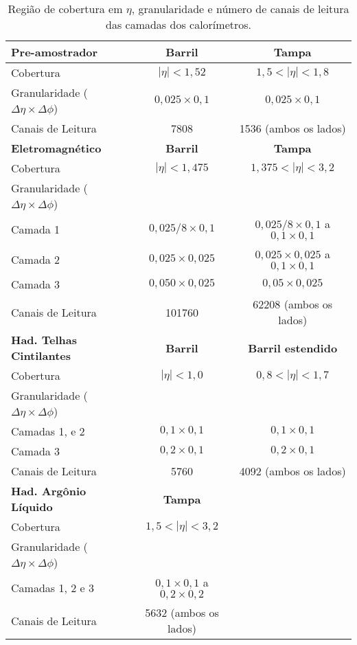\begin{table}[t!]
\centering
\begin{tabular}{l c c}
  \hline
  \hline
  \textbf{Pre-amostrador}    & \textbf{Barril}  & \textbf{Tampa}  \\  \hline
  Cobertura   &  $|\eta|<1,52$ & $1,5<|\eta|<1,8$   \\
  Granularidade ($\Delta \eta \times \Delta \phi$)    &  $0,025 \times 0,1$ & $0,025 \times 0,1$  \\
  Canais de Leitura & 7808 & 1536 (ambos os lados)\\
  \hline
  \hline
  \textbf{Eletromagnético}    & \textbf{Barril}  & \textbf{Tampa}  \\  \hline
  Cobertura   &  $|\eta|<1,475$ & $1,375<|\eta|<3,2$   \\
  Granularidade ($\Delta \eta \times \Delta \phi$)& &  \\
  Camada 1      &  $0,025/8 \times 0,1$ & $0,025/8 \times 0,1$ a $0,1 \times 0,1$  \\
  Camada 2      &  $0,025 \times 0,025$ & $0,025 \times 0,025$ a  $0,1 \times 0,1$  \\
  Camada 3      &  $0,050 \times 0,025$ & $0,05 \times 0,025$   \\
  Canais de Leitura & 101760 & 62208 (ambos os lados)\\
   \hline
   \hline
  \textbf{Had. Telhas Cintilantes}    & \textbf{Barril}  & \textbf{Barril estendido}     \\  \hline
  Cobertura   &  $|\eta|<1,0$ & $0,8<|\eta|<1,7$   \\
  Granularidade ($\Delta \eta \times \Delta \phi$)& &  \\
  Camadas 1, e 2    &  $0,1 \times 0,1$ & $0,1 \times 0,1$   \\
  Camada 3   &  $0,2 \times 0,1$ & $0,2 \times 0,1$   \\
  Canais de Leitura & 5760 & 4092 (ambos os lados)\\
  \hline
     \hline
  \textbf{Had. Argônio Líquido}    & \textbf{Tampa}  &      \\  \hline
  Cobertura   &  $1,5<|\eta|<3,2$  &  \\
  Granularidade ($\Delta \eta \times \Delta \phi$)& &  \\
  Camadas 1, 2 e 3    &  $0,1 \times 0,1$ a $0,2 \times 0,2$ &  \\
  Canais de Leitura & 5632 (ambos os lados)& \\
  \hline
  \hline
\end{tabular}
\caption{Região de cobertura em $\eta$, granularidade e número de
canais de leitura das camadas dos calorímetros.} \label{tab_calo}
\end{table}

